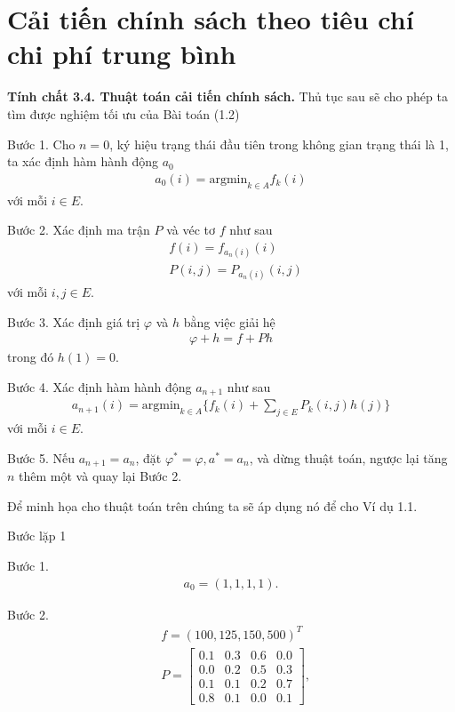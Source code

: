 \documentclass[12pt,a4paper]{report}
\begin{document}
\section{Cải tiến chính sách theo tiêu chí chi phí trung bình}
 \begin{shaded*}
 	\noindent
 	\textbf{Tính chất 3.4. {Thuật toán cải tiến chính sách}.}
 	\selectfont 
 	Thủ tục sau sẽ cho phép ta tìm được nghiệm tối ưu của Bài toán (1.2)
 	
 	\medskip
 	\noindent
 	Bước 1. Cho $n=0$, ký hiệu trạng thái đầu tiên trong không gian trạng thái là 1, ta xác định hàm hành động $a_0$
 	\begin{align*}
 	a_0(i)=\mathrm{argmin}_{k \in A}f_k(i)
 	\end{align*}
 	với mỗi $i \in E$.
 	
 	\medskip
 	\noindent
 	Bước 2. Xác định ma trận $P$ và véc tơ $f$ như sau
 	\begin{align*}
 	&f(i)=f_{a_n(i)}(i)\\
 	&P(i,j)=P_{a_n(i)}(i,j)
 	 \end{align*}
 	 với mỗi $i,j \in E$.
 	
 	\medskip
 	\noindent
 	Bước 3. Xác định giá trị $\varphi$ và $h$ bằng việc giải hệ
 	\begin{align*}
 	\varphi +h=f +Ph
 	\end{align*} 
 	trong đó $h(1)=0$.
 	
 	\medskip
 	\noindent
 	Bước 4. Xác định hàm hành động $a_{n+1}$ như sau
 	\begin{align*}
 	a_{n+1}(i)=\mathrm{argmin}_{k \in A}\{f_k(i)+\sum_{j\in E}P_k(i,j)h(j)\}
 	\end{align*}
 	với mỗi $i \in E$.
 	
 	\medskip
 	\noindent
 	Bước 5.
 	Nếu $a_{n+1}=a_n$, đặt $\varphi^*=\varphi, a^*=a_n$, và dừng thuật toán, ngược lại tăng $n$ thêm một và quay lại Bước 2.
 \end{shaded*}

Để minh họa cho thuật toán trên chúng ta sẽ áp dụng nó để cho Ví dụ 1.1.

\medskip
\noindent
Bước lặp 1

\medskip
\noindent
Bước 1.
\begin{align*}
a_0=(1,1,1,1).
\end{align*}


\medskip
\noindent
Bước 2.
\begin{align*}
&f=(100,125, 150,500)^T\\
&P=\left[
\begin{array}{cccc}
0.1&0.3&0.6&0.0\\
0.0&0.2&0.5&0.3\\
0.1&0.1&0.2&0.7\\
0.8&0.1&0.0&0.1
\end{array}
\right],
\end{align*}
\end{document}
